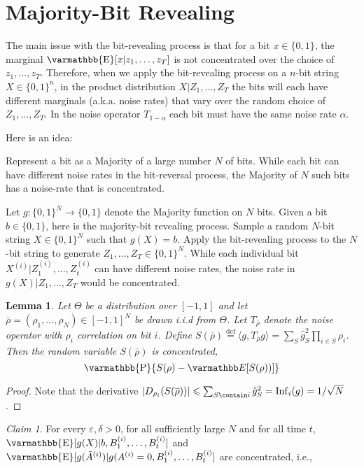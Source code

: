 \documentclass
[12pt,letterpaper]
{article}
\newtheorem{lemma}[theorem]{Lemma}
\theoremstyle{definition}
\theoremstyle{remark}
\newtheorem{claim}[theorem]{Claim}
\let\mathbb\varmathbb
\newcommand{\Esymb}{\mathbb{E}}
\newcommand{\Psymb}{\mathbb{P}}
\DeclareMathOperator*{\E}{\Esymb}
\DeclareMathOperator*{\ProbOp}{\Psymb}
\renewcommand{\Pr}{\ProbOp}
\newcommand{\defeq}{\stackrel{\mathrm{def}}=}
\DeclareMathOperator{\Inf}{Inf}
\newcommand{\bbE}{\mathbb E}
\renewcommand{\leq}{\leqslant}
\let\epsilon=\varepsilon
\numberwithin{equation}{section}
\begin{document}
\section{Majority-Bit Revealing}

The main issue with the bit-revealing process is that for a bit $x \in \{0,1\}$, the marginal $\E[x|z_1,\ldots,z_T]$ is not concentrated over the choice of $z_1,\ldots,z_T$.  Therefore, when we apply the bit-revealing process on a $n$-bit string $X \in \{0,1\}^n$, in the product distribution $X|Z_1,\ldots,Z_T$ the bits will each have different marginals (a.k.a. noise rates) that vary over the random choice of $Z_1,\ldots,Z_T$.  In the noise operator $T_{1-\alpha}$ each bit must have the same noise rate $\alpha$.

Here is an idea:

Represent a bit as a Majority of a large number $N$ of bits.  While each bit can have different noise rates in the bit-reversal process, the Majority of $N$ such bits has a noise-rate that is concentrated.


Let $g: \{0,1\}^N \to \{0,1\} $ denote the Majority function on $N$ bits.  Given a bit $b \in \{0,1\}$, here is the majority-bit revealing process.
Sample a random $N$-bit string $X \in \{0,1\}^N$ such that $g(X) = b$.  Apply the bit-revealing process to the $N$-bit string to generate $Z_1,\ldots, Z_T \in \{0,1\}^N$.  While each individual bit $X^{(i)}|Z^{(i)}_1,\ldots,Z^{(i)}_t$ can have different noise rates, the noise rate in $g(X)|Z_1,\ldots,Z_T$ would be concentrated.


\begin{lemma}
Let $\Theta$ be a distribution over $[-1,1]$ and let $\overline{\rho} = (\rho_1,\ldots,\rho_N) \in [-1,1]^N$ be drawn i.i.d from $\Theta$.  Let $T_{\overline{\rho}}$ denote the noise operator with $\rho_i$ correlation on bit $i$.
%
Define $S(\overline{\rho}) \defeq \langle g, T_{\overline{\rho}} g \rangle = \sum_{S} \hat{g}_S^2 \prod_{i \in S} \rho_i$.
%
Then the random variable $S(\overline{\rho})$ is concentrated,
\[ \Pr\{ S(\rho) - \bbE[S(\rho))]\}\]
\end{lemma}

\begin{proof}
	Note that the derivative $|D_{\rho_i} (S(\overline{\rho}))| \leq \sum_{S \contain i} \hat{g}_S^2 = \Inf_i(g) = 1/\sqrt{N}$.
	
\end{proof}

\begin{claim}
	For every $\epsilon,\delta > 0$, for all sufficiently large $N$ and for all time $t$,  $\E[g(X)| b, B^{(i)}_1,\ldots, B^{(i)}_t]$ and $\E[g(\tilde{A}^{(i)})| g(A^{(i)} = 0, B^{(i)}_1,\ldots, B^{(i)}_t]$ are concentrated, i.e., 
\end{claim}
\end{document}
